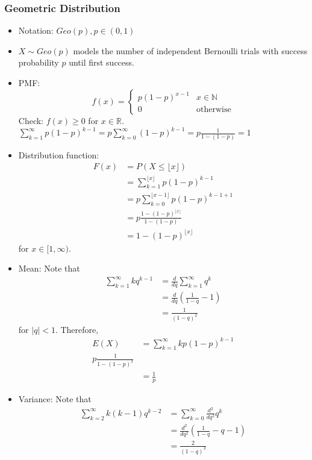 \documentclass{article}
\newcommand{\R}{\mathbb{R}}
\newcommand{\N}{\mathbb{N}}
\begin{document}
		\subsubsection{Geometric Distribution}
		\begin{itemize}
			\item Notation: $Geo(p), p\in(0, 1)$
			\item $X\sim Geo(p)$ models the number of independent Bernoulli trials with success probability $p$ until first success.
			\item PMF: \[f(x)=\begin{cases}
							p(1-p)^{x-1}&x\in\N\\
							0&\mbox{otherwise}
						\end{cases}\]
			Check: $f(x)\geq0$ for $x\in\R$. $\sum_{k=1}^{\infty}p(1-p)^{k-1}=p\sum_{k=0}^{\infty}(1-p)^{k-1}=p\frac{1}{1-(1-p)}=1$
			\item Distribution function:
					\begin{align*}
						F(x)&=P(X\leq\lfloor x\rfloor)\\
						&=\sum_{k=1}^{\lfloor x\rfloor}p(1-p)^{k-1}\\
						&=p\sum_{k=0}^{\lfloor x-1\rfloor}p(1-p)^{k-1+1}\\
						&=p\frac{1-(1-p)^{\lfloor x\rfloor}}{1-(1-p)}\\
						&=1-(1-p)^{\lfloor x\rfloor}
					\end{align*}
					for $x\in[1, \infty)$.
			\item Mean: Note that
					\begin{align*}
						\sum_{k=1}^{\infty}kq^{k-1}&=\frac{d}{dq}\sum_{k=1}^{\infty}q^k\\
						&=\frac{d}{dq}(\frac{1}{1-q}-1)\\
						&=\frac{1}{(1-q)^2}
					\end{align*}
					for $|q|<1$. Therefore,
					\begin{align*}
						E(X)&=\sum_{k=1}^{\infty}kp(1-p)^{k-1}\\
						p\frac{1}{1-(1-p)^2}\\
						&=\frac{1}{p}
					\end{align*}
			\item Variance: Note that
					\begin{align*}
						\sum_{k=2}^{\infty}k(k-1)q^{k-2}&=\sum_{k=0}^{\infty}\frac{d^2}{dq^2}q^k\\
						&=\frac{d^2}{dq^2}(\frac{1}{1-q}-q-1)\\
						&=\frac{2}{(1-q)^3}
					\end{align*}

\end{itemize}
\end{document}
